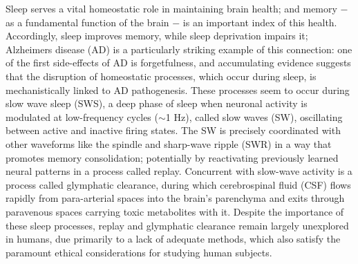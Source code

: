 Sleep serves a vital homeostatic role in maintaining brain health; and memory $-$ as a fundamental function of the brain $-$ is an important index of this health. Accordingly, sleep improves memory, while sleep deprivation impairs it; Alzheimers disease (AD) is a particularly striking example of this connection: one of the first side-effects of AD is forgetfulness, and accumulating evidence suggests that the disruption of homeostatic processes, which occur during sleep, is mechanistically linked to AD pathogenesis. These processes seem to occur during slow wave sleep (SWS), a deep phase of sleep when neuronal activity is modulated at low-frequency cycles ($\sim$1 Hz), called slow waves (SW), oscillating between active and inactive firing states. The SW is precisely coordinated with other waveforms like the spindle and sharp-wave ripple (SWR) in a way that promotes memory consolidation; potentially by reactivating previously learned neural patterns in a process called replay. Concurrent with slow-wave activity is a process called glymphatic clearance, during which cerebrospinal fluid (CSF) flows rapidly from para-arterial spaces into the brain's parenchyma and exits through paravenous spaces carrying toxic metabolites with it. Despite the importance of these sleep processes, replay and glymphatic clearance remain largely unexplored in humans, due primarily to a lack of adequate methods, which also satisfy the paramount ethical considerations for studying human subjects.

